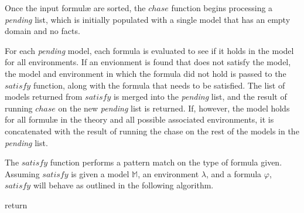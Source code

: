 	Once the input formul{\ae} are sorted, the $chase$ function begins
	processing a \emph{pending} list, which is initially populated with a
	single model that has an empty domain and no facts.

	For each \emph{pending} model, each formula is evaluated to see if it holds
	in the model for all environments. If an envionment is found that does not
	satisfy the model, the model and environment in which the formula did not
	hold is passed to the $satisfy$ function, along with the formula that needs
	to be satisfied. The list of models returned from $satisfy$ is merged into
	the \emph{pending} list, and the result of running $chase$ on the new
	\emph{pending} list is returned. If, however, the model holds for all
	formul{\ae} in the theory and all possible associated environments, it is
	concatenated with the result of running the chase on the rest of the models
	in the \emph{pending} list.

	The $satisfy$ function performs a pattern match on the type of formula
	given. Assuming $satisfy$ is given a model $\mathbb{M}$, an environment
	$\lambda$, and a formula $\varphi$, $satisfy$ will behave as outlined
	in the following algorithm.

	\begin{algorithm}[H]
	\DontPrintSemicolon
	return 
	\end{algorithm}

